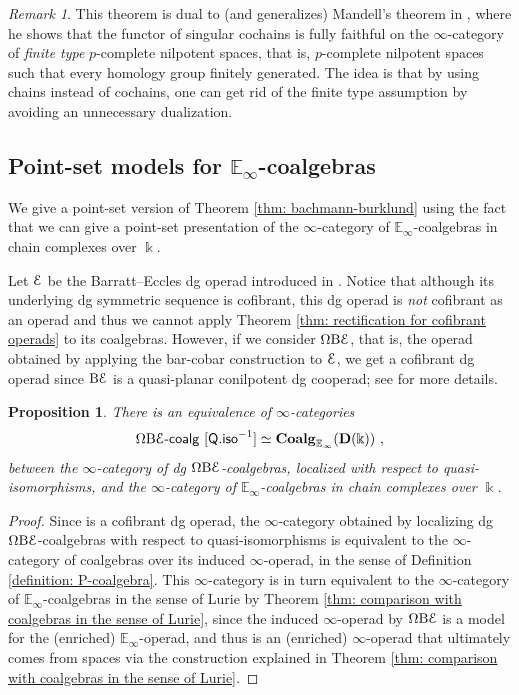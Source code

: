 \documentclass{proc-l}
\renewcommand{\mathcal}{\EuScript}
\theoremstyle{plain}
\newtheorem{proposition}[{theorem}]{Proposition}
\theoremstyle{definition}
\theoremstyle{remark}
\newtheorem{remark}[{theorem}]{Remark}
\newcommand{\kk}{\Bbbk}
\begin{document}
\begin{remark}%
\label{Remark:5.2}This theorem is dual to (and generalizes) Mandell's theorem in \cite{Mandell01}, where he shows that the functor of singular cochains is fully faithful on the $\infty$-category of \textit{finite type} $p$-complete nilpotent spaces, that is, $p$-complete nilpotent spaces such that every homology group finitely generated. The idea is that by using chains instead of cochains, one can get rid of the finite type assumption by avoiding an unnecessary dualization.
\end{remark}

\subsection{Point-set models for $\mathbb{E}_\infty$-coalgebras}%
\label{Section:5.2}
We give a point-set version of Theorem \ref{thm: bachmann-burklund} using the fact that we can give a point-set presentation of the $\infty$-category of $\mathbb{E}_\infty$-coalgebras in chain complexes over $\kk$.

Let $\mathcal{E}$ be the Barratt--Eccles dg operad introduced in \cite{BergerFresse}. Notice that although its underlying dg symmetric sequence is cofibrant, this dg operad is \textit{not} cofibrant as an operad and thus we cannot apply Theorem \ref{thm: rectification for cofibrant operads} to its coalgebras. However, if we consider $\Omega\mathrm{B}\mathcal{E}$, that is, the operad obtained by applying the bar-cobar construction to $\mathcal{E}$, we get a cofibrant dg operad since $\mathrm{B}\mathcal{E}$ is a quasi-planar conilpotent dg cooperad; see \cite[Section 2]{premierpapier} for more details.

\begin{proposition}%
\label{Proposition:5.3}There is an equivalence of $\infty$-categories
\[
\Omega \mathrm{B} \mathcal{E}\text{-}\mathsf{coalg}~[\mathsf{Q.iso}^{-1}] \simeq \mathbf{Coalg}_{\mathbb{E}_\infty}(\mathbf{D}(\kk))~,
\]
between the $\infty$-category of dg $\Omega\mathrm{B}\mathcal{E}$-coalgebras, localized with respect to quasi-isomorphisms, and the $\infty$-category of $\mathbb{E}_\infty$-coalgebras in chain complexes over $\kk$.
\end{proposition}

\begin{proof}
Since is a cofibrant dg operad, the $\infty$-category obtained by localizing dg $\Omega \mathrm{B} \mathcal{E}$-coalgebras with respect to quasi-isomorphisms is equivalent to the $\infty$-category of coalgebras over its induced $\infty$-operad, in the sense of Definition \ref{definition: P-coalgebra}. This $\infty$-category is in turn equivalent to the $\infty$-category of $\mathbb{E}_\infty$-coalgebras in the sense of Lurie by Theorem \ref{thm: comparison with coalgebras in the sense of Lurie}, since the induced $\infty$-operad by $\Omega \mathrm{B} \mathcal{E}$ is a model for the (enriched) $\mathbb{E}_\infty$-operad, and thus is an (enriched) $\infty$-operad that ultimately comes from spaces via the construction explained in Theorem \ref{thm: comparison with coalgebras in the sense of Lurie}.
\end{proof}
\end{document}
